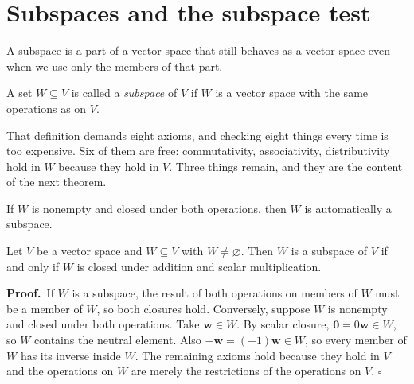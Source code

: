 \section{Subspaces and the subspace test}

A subspace is a part of a vector space that still behaves as a vector space even when we use only
the members of that part.

\begin{definisi}[Subspace]
A set $W\subseteq V$ is called a \emph{subspace} of $V$ if $W$ is a vector space with the same
operations as on $V$.
\end{definisi}

That definition demands eight axioms, and checking eight things every time is too expensive. Six
of them are free: commutativity, associativity, distributivity hold in $W$ because they hold in
$V$. Three things remain, and they are the content of the next theorem.

If $W$ is nonempty and closed under both operations, then $W$ is automatically a subspace.

\begin{teorema}
Let $V$ be a vector space and $W\subseteq V$ with $W\neq\varnothing$. Then $W$ is a subspace of
$V$ if and only if $W$ is closed under addition and scalar multiplication.
\end{teorema}

\par\medskip\noindent\textbf{Proof.}\ 
If $W$ is a subspace, the result of both operations on members of $W$ must be a member of $W$, so
both closures hold. Conversely, suppose $W$ is nonempty and closed under both operations. Take
$\mathbf{w}\in W$. By scalar closure, $\mathbf{0}=0\mathbf{w}\in W$, so $W$ contains the neutral
element. Also $-\mathbf{w}=(-1)\mathbf{w}\in W$, so every member of $W$ has its inverse inside
$W$. The remaining axioms hold because they hold in $V$ and the operations on $W$ are merely the
restrictions of the operations on $V$.
\hfill$\square$\par\medskip

